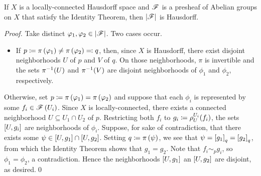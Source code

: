 \documentclass[../Moduli_Spaces_of_Riemann_Surfaces.tex]{subfiles}
\begin{document}
    \begin{proposition}
        If $X$ is a locally-connected Hausdorff space and $\mathscr{F}$ is a presheaf of Abelian groups on $X$ that satisfy the Identity Theorem, then $\left|\mathscr{F}\right|$ is Hausdorff.
    \end{proposition}
    \begin{proof}
        Take distinct $\varphi_1,\varphi_2\in\left|\mathscr{F}\right|$. Two cases occur.
        \begin{itemize}
            \item If $p\coloneqq\pi\left(\varphi_1\right)\neq\pi\left(\varphi_2\right)\eqqcolon q$, then, since $X$ is Hausdorff, there exist disjoint neighborhoods $U$ of $p$ and $V$ of $q$. On those neighborhoods, $\pi$ is invertible and the sets $\pi^{-1}\!\left(U\right)$ and $\pi^{-1}\!\left(V\right)$ are disjoint neighborhoods of $\phi_1$ and $\phi_2$, respectively.
        \end{itemize}
        Otherwise, set $p\coloneqq\pi\left(\varphi_1\right)=\pi\left(\varphi_2\right)$ and suppose that each $\phi_i$ is represented by some $f_i\in\mathscr{F}\left(U_i\right)$. Since $X$ is locally-connected, there exists a connected neighborhood $U\subseteq U_1\cap U_2$ of $p$. Restricting both $f_i$ to $g_i\coloneqq\rho^{U_i}_U\!\left(f_i\right)$, the sets $\left[U,g_i\right]$ are neighborhoods of $\phi_i$. Suppose, for sake of contradiction, that there exists some $\psi\in\left[U,g_1\right]\cap\left[U,g_2\right]$. Setting $q\coloneqq\pi\left(\psi\right)$, we see that $\psi=\left[g_1\right]_q=\left[g_2\right]_q$, from which the Identity Theorem shows that $g_1=g_2$. Note that $f_i\sim_pg_i$, so $\phi_1=\phi_2$, a contradiction. Hence the neighborhoods $\left[U,g_1\right]$ an $\left[U,g_2\right]$ are disjoint, as desired.\qed
    \end{proof}
\end{document}
